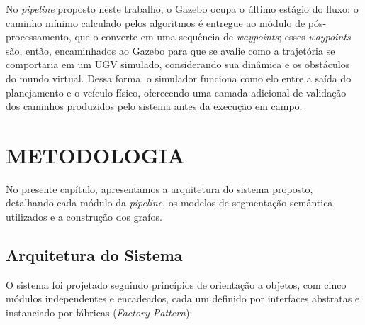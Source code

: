 \documentclass[
    12pt,
    openright,
    oneside,
    a4paper,
    english,
    brazil
]{abntex2}
\begin{document}
No \textit{pipeline} proposto neste trabalho, o Gazebo ocupa o último estágio do fluxo: o caminho mínimo calculado pelos algoritmos é entregue ao módulo de pós-processamento, que o converte em uma sequência de \textit{waypoints}; esses \textit{waypoints} são, então, encaminhados ao Gazebo para que se avalie como a trajetória se comportaria em um UGV simulado, considerando sua dinâmica e os obstáculos do mundo virtual. Dessa forma, o simulador funciona como elo entre a saída do planejamento e o veículo físico, oferecendo uma camada adicional de validação dos caminhos produzidos pelo sistema antes da execução em campo.

\chapter{METODOLOGIA}

No presente capítulo, apresentamos a arquitetura do sistema proposto, detalhando cada módulo da \textit{pipeline}, os modelos de segmentação semântica utilizados e a construção dos grafos.

\section{Arquitetura do Sistema}

O sistema foi projetado seguindo princípios de orientação a objetos, com cinco módulos independentes e encadeados, cada um definido por interfaces abstratas e instanciado por fábricas (\textit{Factory Pattern}):
\end{document}
